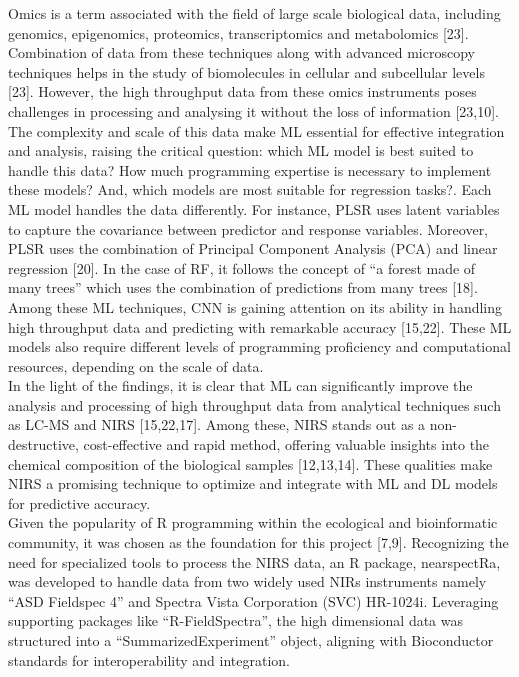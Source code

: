 \documentclass[12pt,a4paper]{report}
\begin{document}
Omics is a term associated with the field of large scale biological data, including genomics, epigenomics, proteomics, transcriptomics and metabolomics [23]. Combination of data from these techniques along with advanced microscopy techniques helps in the study of biomolecules in cellular and subcellular levels [23]. However, the high throughput data from these omics instruments poses challenges in processing and analysing it without the loss of information [23,10]. 
The complexity and scale of this data make ML essential for effective integration and analysis, raising the critical question: which ML model is best suited to handle this data? How much programming expertise is necessary to implement these models? And, which models are most suitable for regression tasks?. Each ML model handles the data differently. For instance, PLSR uses latent variables to capture the covariance between predictor and response variables. Moreover, 
PLSR uses the combination of Principal Component Analysis (PCA) and linear regression [20]. In the case of RF, it follows the concept of “a forest made of many trees” which uses the combination of predictions from many trees [18]. Among these ML techniques, CNN is gaining attention on its ability in handling high throughput data and predicting with remarkable accuracy [15,22]. These ML models also require different levels of programming proficiency and computational resources, depending on the scale of data. \\


In the light of the findings, it is clear that ML can significantly improve the analysis and processing of high throughput data from analytical techniques such as LC-MS and NIRS [15,22,17]. Among these, NIRS stands out as a non-destructive, cost-effective and rapid method, offering valuable insights into the chemical composition of the biological samples [12,13,14]. These qualities make NIRS a promising technique to optimize and integrate with ML and DL models for predictive accuracy. \\


Given the popularity of R programming within the ecological and bioinformatic community, it was chosen as the foundation for this project [7,9]. Recognizing the need for specialized tools to process the NIRS data, an R package, nearspectRa, was developed to handle data from two widely used NIRs instruments namely “ASD Fieldspec 4” and Spectra Vista Corporation (SVC) HR-1024i. 
Leveraging supporting packages like “R-FieldSpectra”, the high dimensional data was structured into a “SummarizedExperiment” object, aligning with Bioconductor standards for interoperability and integration. \\
\end{document}
